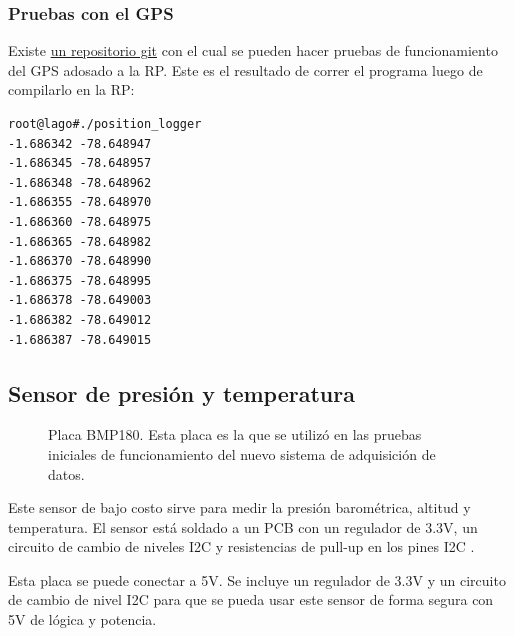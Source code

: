 \documentclass[a4paper,11pt]{article}
\begin{document}
\subsubsection{Pruebas con el GPS}
Existe \href{https://github.com/lagoprojectrp/rp\_venusGps}{un repositorio
git} con el cual se pueden hacer pruebas de funcionamiento del GPS adosado a la
RP. Este es el resultado de correr el programa luego de compilarlo en la RP:
\begin{verbatim}
root@lago#./position_logger
-1.686342 -78.648947
-1.686345 -78.648957
-1.686348 -78.648962
-1.686355 -78.648970
-1.686360 -78.648975
-1.686365 -78.648982
-1.686370 -78.648990
-1.686375 -78.648995
-1.686378 -78.649003
-1.686382 -78.649012
-1.686387 -78.649015
\end{verbatim}

\subsection{Sensor de presión y temperatura}

\begin{figure}[!h]
  \centering
  \caption{Placa BMP180. Esta placa es la que se utilizó en
las pruebas iniciales de funcionamiento del nuevo sistema de adquisición de
datos.}
  \label{fig:bmp180}
\end{figure}

Este sensor de bajo costo sirve para medir la presión barométrica, altitud y
temperatura. El sensor está soldado a un PCB con un regulador de 3.3V, un
circuito de cambio de niveles I2C y resistencias de pull-up en los pines I2C
\cite{bibBMP180}.

Esta placa se puede conectar a 5V. Se incluye un regulador de 3.3V y un circuito de
cambio de nivel I2C para que se pueda usar este sensor de forma segura con 5V de
lógica y potencia.
\end{document}
